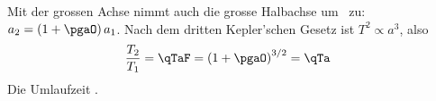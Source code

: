 Mit der grossen Achse nimmt auch die grosse Halbachse um \pgaO\ zu: $a_2 = \left(1+\pgaO\right)a_1$. Nach dem dritten Kepler'schen Gesetz ist $T^2 \propto a^3$, also
\begin{align}
 \frac{T_2}{T_1} &= \qTaF = \left(1+\pgaO\right)^{3/2} = \qTa
\end{align}
Die Umlaufzeit .

